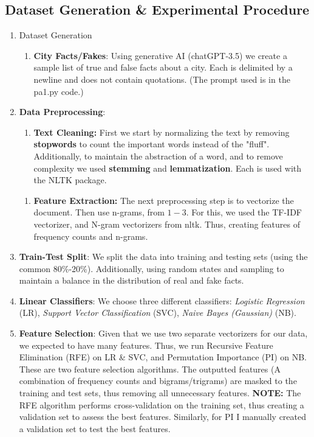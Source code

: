 \documentclass{article}
\begin{document}
\subsection{Dataset Generation \& Experimental Procedure}
\begin{enumerate}
   \item Dataset Generation
   \begin{enumerate}
     \item \textbf{City Facts/Fakes}: Using generative AI (chatGPT-3.5) we create a sample list of true and false facts about a city. Each is delimited by a newline and does not contain quotations. (The prompt used is in the pa1.py code.)
   \end{enumerate}
\item \textbf{Data Preprocessing}:
    \begin{enumerate}
        \item \textbf{Text Cleaning:} First we start by normalizing the text by removing \textbf{stopwords} to count the important words instead of the "fluff". Additionally, to maintain the abstraction of a word, and to remove complexity we used \textbf{stemming} and \textbf{lemmatization}. Each is used with the NLTK package. 
    \end{enumerate}
    \begin{enumerate}
        \item \textbf{Feature Extraction:} The next preprocessing step is to vectorize the document. Then use n-grams, from $1-3$. For this, we used the TF-IDF vectorizer, and N-gram vectorizers from nltk. Thus, creating features of frequency counts and n-grams.
    \end{enumerate}
\item \textbf{Train-Test Split}: We split the data into training and testing sets (using the common 80\%-20\%). Additionally, using random states and sampling to maintain a balance in the distribution of real and fake facts.
\item \textbf{Linear Classifiers}: We choose three different classifiers: \textit{Logistic Regression} (LR), \textit{Support Vector Classification} (SVC), \textit{Naive Bayes (Gaussian)} (NB).
\item \textbf{Feature Selection}: Given that we use two separate vectorizers for our data, we expected to have many features. Thus, we run Recursive Feature Elimination (RFE) on LR \& SVC, and Permutation Importance (PI) on NB. These are two feature selection algorithms. The outputted features (A combination of frequency counts and bigrams/trigrams) are masked to the training and test sets, thus removing all unnecessary features. \textbf{NOTE:} The RFE algorithm performs cross-validation on the training set, thus creating a validation set to assess the best features. Similarly, for PI I manually created a validation set to test the best features. 

\end{enumerate}
\end{document}
